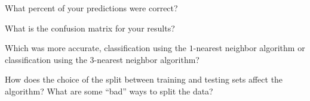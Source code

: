 \documentclass[10pt]{article}
\begin{document}
What percent of your predictions were correct?
\vfill

What is the confusion matrix for your results?
\vfill

Which was more accurate, classification using the $1$-nearest neighbor algorithm or classification using the $3$-nearest neighbor algorithm?
\vfill

How does the choice of the split between training and testing sets affect the algorithm? What are some ``bad'' ways to split the data?
\vfill
\end{document}

